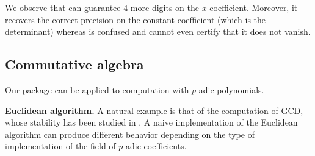 \documentclass[sigconf]{acmart}
\newcommand{\ZpCR}{\text{\color{output} \rm \tt ZpCR}\xspace}
\newcommand{\ZpLC}{\text{\color{output} \rm \tt ZpLC}\xspace}
\theoremstyle{definition}
\begin{document}
\smallskip

\noindent
We observe that \ZpLC can guarantee $4$ more digits on the $x$ 
coefficient. Moreover, it recovers the correct precision on the
constant coefficient (which is the determinant) whereas \ZpCR is 
confused and cannot even certify that it does not vanish.

\subsection{Commutative algebra}
\label{ssec:comalg}

Our package can be applied to computation with $p$-adic polynomials. 

\medskip

\noindent \textbf{Euclidean algorithm.}
%
A natural example is that of the computation of GCD, whose stability has 
been studied in \cite{caruso:2017}.
A naive implementation of the Euclidean algorithm can produce different 
behavior depending on the type of implementation of the field of 
$p$-adic coefficients.

\smallskip
\end{document}
